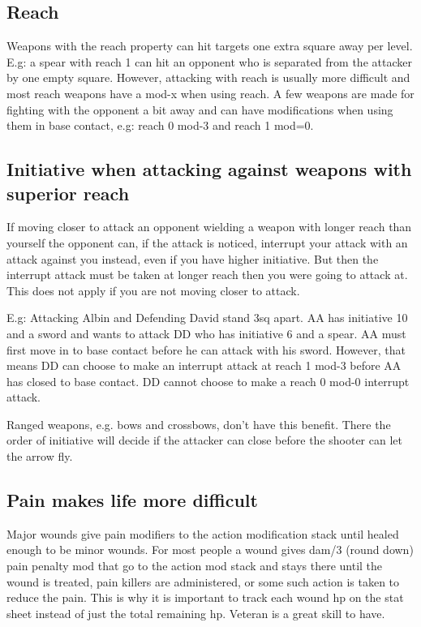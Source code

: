\subsection*{Reach}
Weapons with the reach property can hit targets one extra square away per level.
E.g: a spear with reach 1 can hit an opponent who is separated from the attacker by one empty square. However, attacking with reach is usually more difficult and most reach weapons have a mod-x when using reach.
A few weapons are made for fighting with the opponent a bit away and can have modifications when using them in base contact, e.g: reach 0 mod-3 and reach 1 mod=0.


\subsection*{Initiative when attacking against weapons with superior reach}
If moving closer to attack an opponent wielding a weapon with longer reach than yourself the opponent can, if the attack is noticed, interrupt your attack with an attack against you instead, even if you have higher initiative. But then the interrupt attack must be taken at longer reach then you were going to attack at. This does not apply if you are not moving closer to attack.

E.g: Attacking Albin and Defending David stand 3sq apart. AA has initiative 10 and a sword and wants to attack DD who has initiative 6 and a spear. AA must first move in to base contact before he can attack with his sword. However, that means DD can choose to make an interrupt attack at reach 1 mod-3 before AA has closed to base contact. DD cannot choose to make a reach 0 mod-0 interrupt attack.

Ranged weapons, e.g. bows and crossbows, don't have this benefit. There the order of initiative will decide if the attacker can close before the shooter can let the arrow fly.


\subsection*{Pain makes life more difficult}
Major wounds give pain modifiers to the action modification stack until healed enough to be minor wounds.
For most people a wound gives dam/3 (round down) pain penalty mod that go to the action mod stack and stays there until the wound is treated, pain killers are administered, or some such action is taken to reduce the pain. This is why it is important to track each wound hp on the stat sheet instead of just the total remaining hp.
Veteran is a great skill to have.

